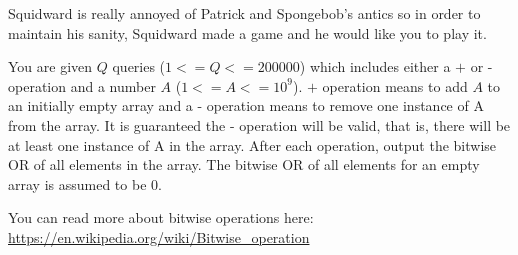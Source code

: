 \documentclass{article}
\begin{document}
Squidward is really annoyed of Patrick and Spongebob's antics so in order to maintain his sanity, Squidward made a game and he would like you to play it.

You are given $Q$ queries ($1 <= Q <= 200000$) which includes either a $\textbf{+}$ or $\textbf{-}$ operation and a number $A$ ($1 <= A <= 10^9$). $\textbf{+}$ operation means to add $A$ to an initially empty array and a $\textbf{-}$ operation means to remove one instance of A from the array. It is guaranteed the $\textbf{-}$ operation will be valid, that is, there will be at least one instance of A in the array. After each operation, output the bitwise OR of all elements in the array. The bitwise OR of all elements for an empty array is assumed to be 0.

You can read more about bitwise operations here: \url{https://en.wikipedia.org/wiki/Bitwise_operation}
\end{document}
